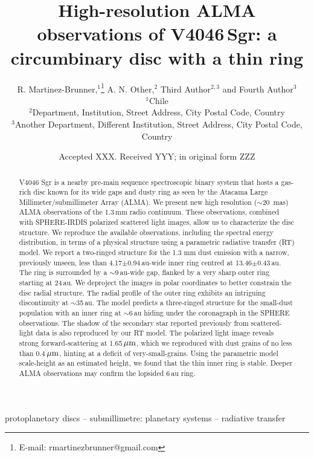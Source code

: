 \documentclass[letters,usenatbib,times]{mnras}
\title[High-resolution ALMA observations of V4046\,Sgr]{High-resolution ALMA observations of V4046\,Sgr: a circumbinary disc with a thin ring}
\author[R. Martinez Brunner et al.]{
R. Martinez-Brunner,$^{1}$\thanks{E-mail: rmartinezbrunner@gmail.com}
A. N. Other,$^{2}$
Third Author$^{2,3}$
and Fourth Author$^{3}$
\\
$^{1}$Chile\\
$^{2}$Department, Institution, Street Address, City Postal Code, Country\\
$^{3}$Another Department, Different Institution, Street Address, City Postal Code, Country
}
\date{Accepted XXX. Received YYY; in original form ZZZ}
\begin{document}
\label{firstpage}
\pagerange{\pageref{firstpage}--\pageref{lastpage}}
\maketitle

\begin{abstract}
    V4046 Sgr is a nearby pre-main sequence spectroscopic binary system that hosts a gas-rich disc known for its wide gaps and dusty ring as seen by the Atacama Large Millimeter/submillimeter Array (ALMA).    We present new high resolution ($\sim$20\, mas) ALMA observations of the 1.3\,mm radio continuum. These observations, combined with SPHERE-IRDIS polarized scattered light images, allow us to characterize the disc structure.  We reproduce the available observations, including the spectral energy distribution, in terms of a physical structure using a parametric radiative transfer (RT) model.  We report a two-ringed structure for the 1.3 mm dust emission with a narrow, previously unseen, less than 4.17$\pm$0.94\,au-wide inner ring centred at 13.46$\pm$0.43\,au.  The ring is surrounded by a $\sim$9\,au-wide gap, flanked by a very sharp outer ring starting at 24\,au.  We deproject the images in polar coordinates to better constrain the disc radial structure.  The radial profile of the outer ring exhibits an intriguing discontinuity at $\sim$35\,au.   The model predicts a three-ringed structure for the small-dust population with an inner ring at $\sim$6\,au hiding under the coronagraph in the SPHERE observations.  The shadow of the secondary star reported previously from scattered-light data is also reproduced by our RT model. The polarized light image reveals strong forward-scattering at 1.65\,$\hbox{$\mu$m}$, which we reproduced with dust grains of no less than 0.4\,$\hbox{$\mu$m}$, hinting at a deficit of very-small-grains. Using the parametric model scale-height as an estimated height, we found that the thin inner ring is stable. Deeper ALMA observations may confirm the lopsided 6\,au ring.
\end{abstract}

\begin{keywords}
 protoplanetary discs -- submillimetre: planetary systems -- radiative transfer
\end{keywords}


\end{document}
